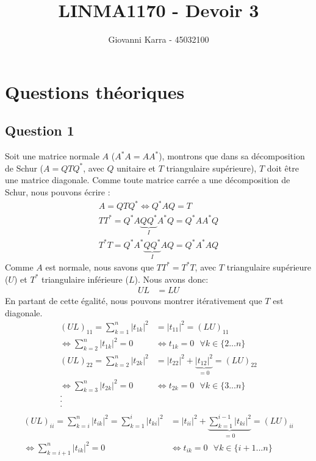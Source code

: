\documentclass[11pt]{article}
\title{LINMA1170 - Devoir 3}
\author{Giovanni Karra - 45032100}
\begin{document}
\maketitle

\section*{Questions théoriques}

\subsection*{Question 1}

Soit une matrice normale $A$ ($A^*A = AA^*$), montrons que dans sa décomposition de Schur ($A = QTQ^*$, avec $Q$ unitaire et $T$ triangulaire supérieure), $T$ doit être une matrice diagonale. Comme toute matrice carrée a une décomposition de Schur, nous pouvons écrire :
\begin{align}
	A = QTQ^* \Leftrightarrow Q^*AQ = T\\
	TT^* = Q^*A\underbrace{QQ^*}_IA^*Q = Q^*AA^*Q\\
	T^*T = Q^*A^*\underbrace{QQ^*}_IAQ = Q^*A^*AQ
\end{align}
Comme $A$ est normale, nous savons que $TT^* = T^*T$, avec $T$ triangulaire supérieure ($U$) et $T^*$ triangulaire inférieure ($L$). Nous avons donc:
\begin{align*}
	UL &= LU
\end{align*}
En partant de cette égalité, nous pouvons montrer itérativement que $T$ est diagonale.
\begin{align*}
	(UL)_{11} = \sum_{k=1}^{n}|t_{1k}|^2 &= |t_{11}|^2 = (LU)_{11}\\
	\Leftrightarrow \sum_{k=2}^{n}|t_{1k}|^2 = 0 &\Leftrightarrow t_{1k} = 0 ~~~ \forall k \in \{2...n\}\\
	(UL)_{22} = \sum_{k=2}^{n}|t_{2k}|^2 &= |t_{22}|^2 + \underbrace{|t_{12}|^2}_{=0} = (LU)_{22}\\
	\Leftrightarrow \sum_{k=3}^{n}|t_{2k}|^2 = 0 &\Leftrightarrow t_{2k} = 0 ~~~ \forall k \in \{3...n\}\\ . \\ . \\ . \\
\end{align*}
\begin{align*}
	(UL)_{ii} = \sum_{k=i}^{n}|t_{ik}|^2 = \sum_{k=1}^{i}|t_{ki}|^2 &= |t_{ii}|^2 + \underbrace{\sum_{k=1}^{i-1}|t_{ki}|^2}_{= 0} = (LU)_{ii}\\
	\Leftrightarrow \sum_{k=i+1}^{n}|t_{ik}|^2 = 0 &\Leftrightarrow t_{ik} = 0 ~~~ \forall k \in \{i+1...n\}
\end{align*}
\end{document}
